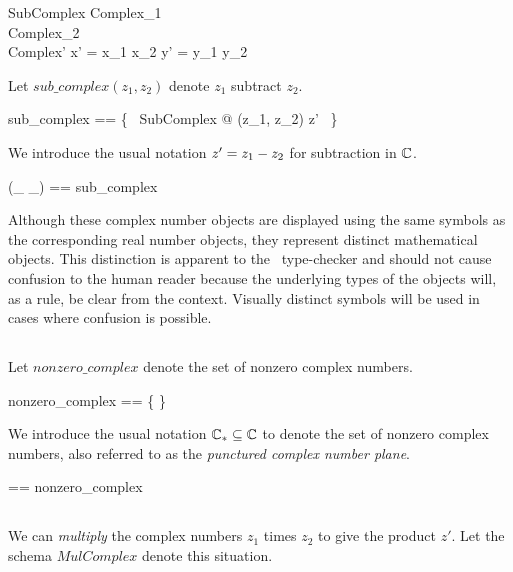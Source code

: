 \documentclass[11pt, oneside]{article}
\begin{document}
\begin{schema}{SubComplex}
	Complex_1 \\
	Complex_2 \\
	Complex'
\where
	x' = x_1 \subR x_2
\also
	y' = y_1 \subR y_2
\end{schema}

Let $sub\_complex(z_1, z_2)$ denote $z_1$ subtract $z_2$.

\begin{zed}
	sub\_complex == \{~ SubComplex @ (z_1, z_2) \mapsto z' ~\}
\end{zed}

We introduce the usual notation $z' = z_1 \mathbin{-} z_2$ for subtraction in $\mathbb{C}$.

\begin{zed}
	(\_ \subC \_) == sub\_complex
\end{zed}

Although these complex number objects are displayed using the same symbols as the corresponding real number objects,
they represent distinct mathematical objects.
This distinction is apparent to the \fuzz\ type-checker and should not cause confusion to the human reader
because the underlying types of the objects will, as a rule, be clear from the context.
Visually distinct symbols will be used in cases where confusion is possible.

\subsection{}

Let $nonzero\_complex$ denote the set of nonzero complex numbers.

\begin{zed}
	nonzero\_complex == \C \setminus \{ \zeroC \}
\end{zed}

We introduce the usual notation $\mathbb{C}_{*} \subseteq \mathbb{C}$ to denote the set of nonzero complex numbers,
also referred to as the \textit{punctured complex number plane}.

\begin{zed}
	\Cnz == nonzero\_complex
\end{zed}

\subsection{}

We can \textit{multiply} the complex numbers $z_1$ times $z_2$ to give the product $z'$.
Let the schema $MulComplex$ denote this situation.
\end{document}
